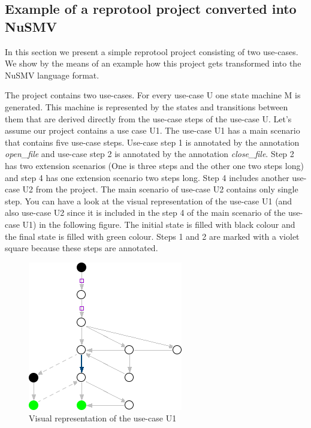 \subsection{Example of a reprotool project converted into NuSMV}

In this section we present a simple reprotool project consisting of two use-cases. We show by the means of an example how this project
gets transformed into the NuSMV language format.

The project contains two use-cases. For every use-case U one state machine M is generated. This machine is represented by the states and
transitions between them that are derived directly from the use-case steps of the use-case U. Let's assume our project contains a use
case U1. The use-case U1 has a main scenario that contains five use-case steps. Use-case step 1 is annotated by the annotation \emph{open\_file}
and use-case step 2 is annotated by the annotation \emph{close\_file}. Step 2 has two extension scenarios (One is three steps and the other
one two steps long) and step 4 has one extension scenario two steps long. Step 4 includes another use-case U2 from the project. The
main scenario of use-case U2 contains only single step. You can have a look at the visual representation of the use-case U1 (and also
use-case U2 since it is included in the step 4 of the main scenario of the use-case U1) in the following figure. The initial state is
filled with black colour and the final state is filled with green colour. Steps 1 and 2 are marked with a violet square because these
steps are annotated.

\begin{figure}[h]
  \centering
  \includegraphics{images/uc1}
  \caption{Visual representation of the use-case U1}
  \label{fig:use-case U1}
\end{figure}

